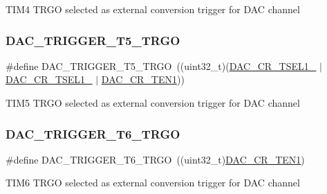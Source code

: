 T\+I\+M4 T\+R\+GO selected as external conversion trigger for D\+AC channel \mbox{\label{group___d_a_c__trigger__selection_gaedb5ca1f0e01baaaabe5884ecfa5c7d5}} 
\subsubsection{\texorpdfstring{DAC\_TRIGGER\_T5\_TRGO}{DAC\_TRIGGER\_T5\_TRGO}}
{\footnotesize\ttfamily \#define D\+A\+C\+\_\+\+T\+R\+I\+G\+G\+E\+R\+\_\+\+T5\+\_\+\+T\+R\+GO~((uint32\+\_\+t)(\mbox{\hyperlink{group___peripheral___registers___bits___definition_ga265e32c4fc43310acdf3ebea01376766}{D\+A\+C\+\_\+\+C\+R\+\_\+\+T\+S\+E\+L1\+\_}} $\vert$ \mbox{\hyperlink{group___peripheral___registers___bits___definition_ga8dfa13ec123c583136e24b7890add45b}{D\+A\+C\+\_\+\+C\+R\+\_\+\+T\+S\+E\+L1\+\_}} $\vert$ \mbox{\hyperlink{group___peripheral___registers___bits___definition_ga998aa4fd791ea2f4626df6ddc8fc7109}{D\+A\+C\+\_\+\+C\+R\+\_\+\+T\+E\+N1}}))}

T\+I\+M5 T\+R\+GO selected as external conversion trigger for D\+AC channel \mbox{\label{group___d_a_c__trigger__selection_ga9321fce86df1db6d865fb4765a3cffa7}} 
\subsubsection{\texorpdfstring{DAC\_TRIGGER\_T6\_TRGO}{DAC\_TRIGGER\_T6\_TRGO}}
{\footnotesize\ttfamily \#define D\+A\+C\+\_\+\+T\+R\+I\+G\+G\+E\+R\+\_\+\+T6\+\_\+\+T\+R\+GO~((uint32\+\_\+t)\mbox{\hyperlink{group___peripheral___registers___bits___definition_ga998aa4fd791ea2f4626df6ddc8fc7109}{D\+A\+C\+\_\+\+C\+R\+\_\+\+T\+E\+N1}})}

T\+I\+M6 T\+R\+GO selected as external conversion trigger for D\+AC channel \mbox{\label{group___d_a_c__trigger__selection_ga474fb4e041fe94e863ce13c330e52912}} 
